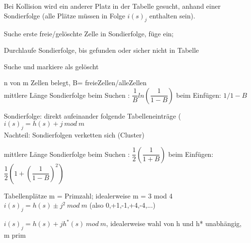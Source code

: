 Bei Kollision wird ein anderer Platz in der Tabelle gesucht, anhand einer Sondierfolge (alle Plätze müssen in Folge $i(s)_j$ enthalten sein).

Suche erste freie/gelöschte Zelle in Sondierfolge, füge ein;

Durchlaufe Sondierfolge, bis gefunden oder sicher nicht in Tabelle 

 Suche und markiere als gelöscht

n von m Zellen belegt, B= freieZellen/alleZellen \\
mittlere Länge Sondierfolge beim Suchen : $\dfrac{1}{B}ln\left(\dfrac{1}{1-B}\right)$
beim Einfügen: $1/1-B$

Sondierfolge: direkt aufeinander folgende Tabelleneinträge ($i(s)_j=h(s)+j~mod~m$\\
Nachteil: Sondierfolgen verketten sich (Cluster)

mittlere Länge Sondierfolge beim Suchen : $\dfrac{1}{2}\left(\dfrac{1}{1+B}\right)$
beim Einfügen:  $\dfrac{1}{2}\left(1+\left(\dfrac{1}{1-B}\right)^2\right)$

Tabellenplätze m = Primzahl; idealerweise m = 3 mod 4 \\
$i(s)_j = h(s) \pm j^2~mod~m$ (also 0,+1,-1,+4,-4,...) 

$i(s)_j = h(s) + jh^*(s)~ mod~ m$, idealerweise wahl von h und h* unabhängig, m prim

